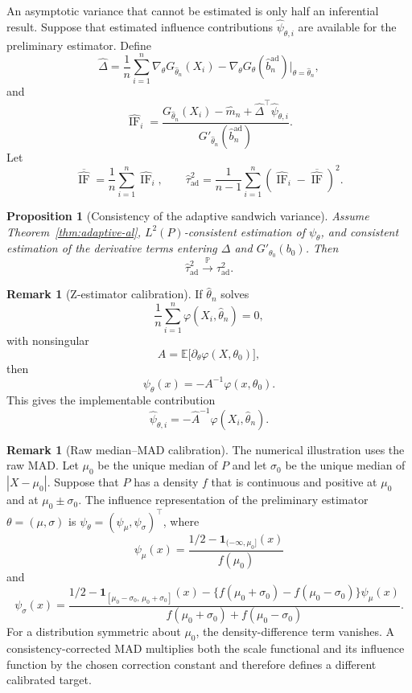 \documentclass[11pt,a4paper]{article}
\newtheorem{proposition}[theorem]{Proposition}
\theoremstyle{definition}
\newtheorem{remark}[theorem]{Remark}
\newcommand{\E}{\mathbb{E}}
\newcommand{\Prob}{\mathbb{P}}
\newcommand{\IF}{\operatorname{IF}}
\begin{document}
An asymptotic variance that cannot be estimated is only half an inferential result. Suppose that estimated influence contributions $\widehat\psi_{\theta,i}$ are available for the preliminary estimator. Define
\[
\widehat\Delta
=
\frac1n\sum_{i=1}^n
\nabla_\theta G_{\widehat\theta_n}(X_i)
-
\nabla_\theta G_\theta(\widehat b_n^{\mathrm{ad}})
\big|_{\theta=\widehat\theta_n},
\]
and
\[
\widehat{\IF}_{i}
=
\frac{
G_{\widehat\theta_n}(X_i)-\widehat m_n
+
\widehat\Delta^\top\widehat\psi_{\theta,i}
}
{G'_{\widehat\theta_n}(\widehat b_n^{\mathrm{ad}})}.
\]
Let
\[
\overline{\widehat{\IF}}
=
\frac1n\sum_{i=1}^n\widehat{\IF}_{i},
\qquad
\widehat\tau_{\mathrm{ad}}^2
=
\frac1{n-1}\sum_{i=1}^n
(\widehat{\IF}_{i}-\overline{\widehat{\IF}})^2.
\]

\begin{proposition}[Consistency of the adaptive sandwich variance]\label{prop:adaptive-var}
Assume Theorem~\ref{thm:adaptive-al}, $L^2(P)$-consistent estimation of $\psi_\theta$, and consistent estimation of the derivative terms entering $\Delta$ and $G'_{\theta_0}(b_0)$. Then
\[
\widehat\tau_{\mathrm{ad}}^2\xrightarrow{\Prob}\tau_{\mathrm{ad}}^2.
\]
\end{proposition}

\begin{remark}[Z-estimator calibration]
If $\widehat\theta_n$ solves
\[
\frac1n\sum_{i=1}^n\varphi(X_i,\widehat\theta_n)=0,
\]
with nonsingular
\[
A=\E\bigl[\partial_\theta\varphi(X,\theta_0)\bigr],
\]
then
\[
\psi_\theta(x)=-A^{-1}\varphi(x,\theta_0).
\]
This gives the implementable contribution
\[
\widehat\psi_{\theta,i}
=-\widehat A^{-1}\varphi(X_i,\widehat\theta_n).
\]
\end{remark}

\begin{remark}[Raw median--MAD calibration]\label{rem:median-mad}
The numerical illustration uses the raw MAD. Let $\mu_0$ be the unique median of $P$ and let $\sigma_0$ be the unique median of $|X-\mu_0|$. Suppose that $P$ has a density $f$ that is continuous and positive at $\mu_0$ and at $\mu_0\pm\sigma_0$. The influence representation of the preliminary estimator $\theta=(\mu,\sigma)$ is $\psi_\theta=(\psi_\mu,\psi_\sigma)^\top$, where
\[
\psi_\mu(x)
=
\frac{1/2-\mathbf 1_{(-\infty,\mu_0]}(x)}{f(\mu_0)}
\]
and
\[
\psi_\sigma(x)
=
\frac{
1/2-\mathbf 1_{[\mu_0-\sigma_0,\,\mu_0+\sigma_0]}(x)
-\{f(\mu_0+\sigma_0)-f(\mu_0-\sigma_0)\}\psi_\mu(x)
}{f(\mu_0+\sigma_0)+f(\mu_0-\sigma_0)}.
\]
For a distribution symmetric about $\mu_0$, the density-difference term vanishes. A consistency-corrected MAD multiplies both the scale functional and its influence function by the chosen correction constant and therefore defines a different calibrated target.
\end{remark}
\end{document}
